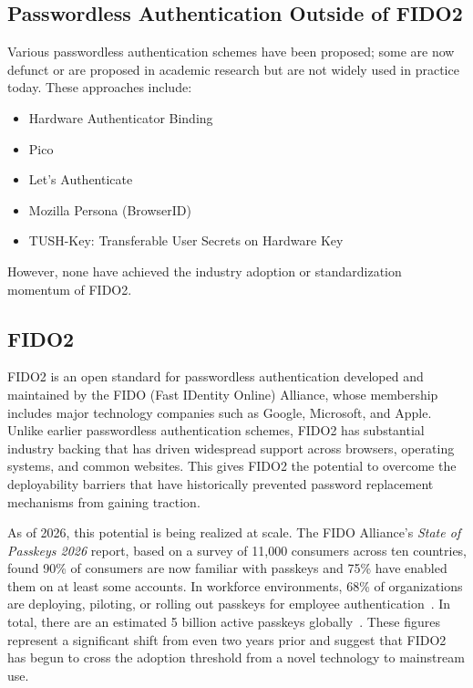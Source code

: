 \subsection{Passwordless Authentication Outside of FIDO2}
\label{sec:other-passwordless}

Various passwordless authentication schemes have been proposed; some are now defunct or are proposed in academic research but are not widely used in practice today. These approaches include:

\begin{itemize}
    \item Hardware Authenticator Binding~\cite{shiraishi_hab_2025}
    \item Pico~\cite{stajano_pico_2011}
    \item Let's Authenticate~\cite{conners_lets_authenticate_way_2019,conners_lets_authenticate_2022}
    \item Mozilla Persona (BrowserID)~\cite{adida_browserid_2011}
    \item TUSH-Key: Transferable User Secrets on Hardware Key~\cite{sethuraman_tush_key_2024}
\end{itemize}

\noindent However, none have achieved the industry adoption or standardization momentum of FIDO2.

\subsection{FIDO2}
\label{sec:fido2-core}

FIDO2 is an open standard for passwordless authentication developed and maintained by the FIDO (Fast IDentity Online) Alliance, whose membership includes major technology companies such as Google, Microsoft, and Apple. Unlike earlier passwordless authentication schemes, FIDO2 has substantial industry backing that has driven widespread support across browsers, operating systems, and common websites. This gives FIDO2 the potential to overcome the deployability barriers that have historically prevented password replacement mechanisms from gaining traction.

As of 2026, this potential is being realized at scale. The FIDO Alliance's \emph{State of Passkeys 2026} report, based on a survey of 11{,}000 consumers across ten countries, found 90\% of consumers are now familiar with passkeys and 75\% have enabled them on at least some accounts. In workforce environments, 68\% of organizations are deploying, piloting, or rolling out passkeys for employee authentication~\cite{fido_state_of_passkeys_2026}. In total, there are an estimated 5 billion active passkeys globally~\cite{fido_state_of_passkeys_2026}. These figures represent a significant shift from even two years prior and suggest that FIDO2 has begun to cross the adoption threshold from a novel technology to mainstream use.


